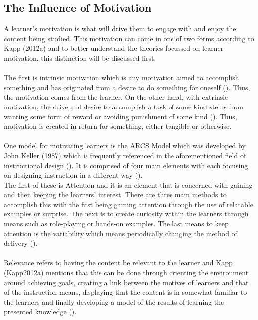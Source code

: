 \subsection{The Influence of Motivation}
A learner's motivation is what will drive them to engage with and enjoy the content being studied. This motivation can come in one of two forms according to Kapp (2012a) and to better understand the theories focussed on learner motivation, this distinction will be discussed first.
\\\\
The first is intrinsic motivation which is any motivation aimed to accomplish something and has originated from a desire to do something for oneself (\cite{Kapp2012a}). Thus, the motivation comes from the learner. On the other hand, with extrinsic motivation, the drive and desire to accomplish a task of some kind stems from wanting some form of reward or avoiding punishment of some kind (\cite{Kapp2012a}). Thus, motivation is created in return for something, either tangible or otherwise. 
\\\\
One model for motivating learners is the ARCS Model which was developed by John Keller (1987) which is frequently referenced in the aforementioned field of instructional design (\cite{Kapp2012a}). It is comprised of four main elements with each focusing on designing instruction in a different way (\cite{Kapp2012a, keller1987development}). 
\\
The first of these is Attention and it is an element that is concerned with gaining and then keeping the learners’ interest. There are three main methods to accomplish this with the first being gaining attention through the use of relatable examples or surprise. The next is to create curiosity within the learners through means such as role-playing or hands-on examples. The last means to keep attention is the variability which means periodically changing the method of delivery (\cite{Kapp2012a, keller1987development}).
\\\\
Relevance refers to having the content be relevant to the learner and Kapp (Kapp2012a) mentions that this can be done through orienting the environment around achieving goals, creating a link between the motives of learners and that of the instruction means, displaying that the content is in somewhat familiar to the learners and finally developing a model of the results of learning the presented knowledge (\cite{keller1987development}).
\\\\
